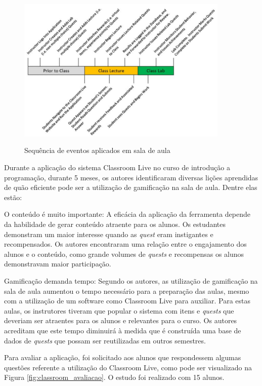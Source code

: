\documentclass[
	12pt,				%
	oneside,			%
	a4paper,			%
	english,			%
	french,				%
	spanish,			%
	brazil,				%
	]{abntex2}
\begin{document}
\begin{figure}[ht]
\centering
\caption{Sequência de eventos aplicados em sala de aula}
\includegraphics[width=0.9\textwidth]{imagens/classroom_aula.png}
\label{fig:classroom_aula}
\end{figure}

Durante a aplicação do sistema Classroom Live no curso de introdução a programação, durante 5 meses, os autores identificaram diversas lições aprendidas de quão eficiente pode ser a utilização de gamificação na sala de aula. Dentre elas estão:

O conteúdo é muito importante: A eficácia da aplicação da ferramenta depende da habilidade de gerar conteúdo atraente para os alunos. Os estudantes demonstram um maior interesse quando as \textit{quest} eram instigantes e recompensados. Os autores encontraram uma relação entre o engajamento dos alunos e o conteúdo, como grande volumes de \textit{quests} e recompensas os alunos demonstravam maior participação.

Gamificação demanda tempo: Segundo os autores, as utilização de gamificação na sala de aula aumentou o tempo necessário para a preparação das aulas, mesmo com a utilização de um software como Classroom Live para auxiliar. Para estas aulas, os instrutores tiveram que popular o sistema com itens e \textit{quests} que deveriam ser atraentes para os alunos e relevantes para o curso. Os autores acreditam que este tempo diminuirá à medida que é construída uma base de dados de \textit{quests} que possam ser reutilizadas em outros semestres.

Para avaliar a aplicação, foi solicitado aos alunos que respondessem algumas questões referente a utilização do Classroom Live, como pode ser visualizado na Figura \ref{fig:classroom_avaliacao}. O estudo foi realizado com 15 alunos.
\end{document}

